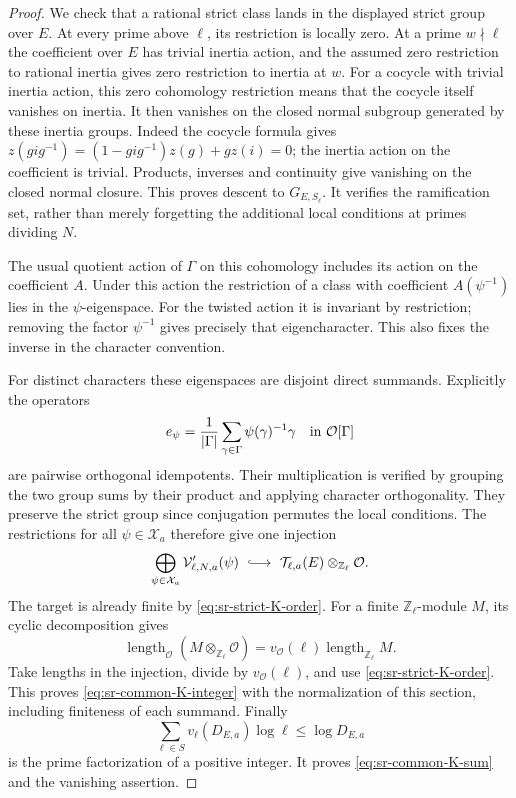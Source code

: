 \begin{proof}
We check that a rational strict class lands in the displayed
strict group over \(E\).
At every prime above \(\ell\), its restriction is locally zero.
At a prime \(w\nmid\ell\) the coefficient over \(E\) has trivial
inertia action, and the assumed zero restriction to rational
inertia gives zero restriction to inertia at \(w\).
For a cocycle with trivial inertia action, this zero cohomology
restriction means that the cocycle itself vanishes on inertia.
It then vanishes on the closed normal subgroup generated by these
inertia groups.
Indeed the cocycle formula gives
\(z(gig^{-1})=(1-gig^{-1})z(g)+gz(i)=0\);
the inertia action on the coefficient is trivial.
Products, inverses and continuity give vanishing on the closed
normal closure.
This proves descent to \(G_{E,S_\ell}\).
It verifies the ramification set, rather than merely forgetting
the additional local conditions at primes dividing \(N\).

The usual quotient action of \(\Gamma\) on this cohomology
includes its action on the coefficient \(A\).
Under this action the restriction of a class with coefficient
\(A(\psi^{-1})\) lies in the \(\psi\)-eigenspace.
For the twisted action it is invariant by restriction; removing
the factor \(\psi^{-1}\) gives precisely that eigencharacter.
This also fixes the inverse in the character convention.

For distinct characters these eigenspaces are disjoint direct
summands.
Explicitly the operators
\[
       e_\psi=\frac1{|\Gamma|}
                  \sum_{\gamma\in\Gamma}
                          \psi(\gamma)^{-1}\gamma
                        \quad\hbox{in }\mathcal O[\Gamma]
\]
are pairwise orthogonal idempotents.
Their multiplication is verified by grouping the two group sums
by their product and applying character orthogonality.
They preserve the strict group since conjugation permutes the
local conditions.
The restrictions for all \(\psi\in\mathcal X_a\) therefore give
one injection
\[
 \bigoplus_{\psi\in\mathcal X_a}
                   \mathcal V'_{\ell,N,a}(\psi)
       \ \lhook\joinrel\longrightarrow\
                \mathcal T_{\ell,a}(E)
                                \otimes_{\mathbb Z_\ell}\mathcal O.
\]
The target is already finite by \eqref{eq:sr-strict-K-order}.
For a finite \(\mathbb Z_\ell\)-module \(M\), its cyclic
decomposition gives
\[
 \operatorname{length}_{\mathcal O}
                 (M\otimes_{\mathbb Z_\ell}\mathcal O)
       =v_{\mathcal O}(\ell)
                          \operatorname{length}_{\mathbb Z_\ell}M.
\]
Take lengths in the injection, divide by
\(v_{\mathcal O}(\ell)\), and use
\eqref{eq:sr-strict-K-order}.
This proves \eqref{eq:sr-common-K-integer} with the normalization
of this section, including finiteness of each summand.
Finally
\[
       \sum_{\ell\in S}v_\ell(D_{E,a})\log\ell
                              \leq\log D_{E,a}
\]
is the prime factorization of a positive integer.
It proves \eqref{eq:sr-common-K-sum} and the vanishing assertion.
\end{proof}

